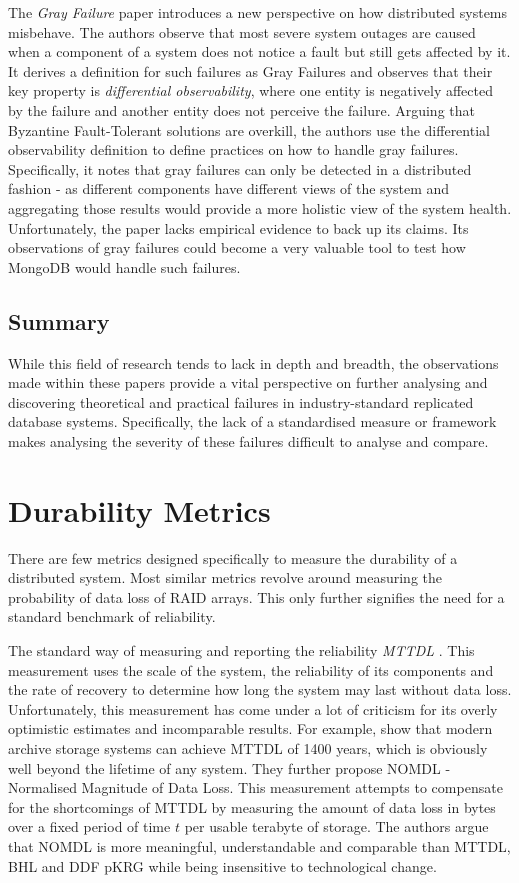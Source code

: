 The \textit{Gray Failure} \citep{gray-failure} paper introduces a new perspective on how distributed systems misbehave. The authors observe that most severe system outages are caused when a component of a system does not notice a fault but still gets affected by it. It derives a definition for such failures as Gray Failures and observes that their key property is \textit{differential observability}, where one entity is negatively affected by the failure and another entity does not perceive the failure. Arguing that Byzantine Fault-Tolerant solutions are overkill, the authors use the differential observability definition to define practices on how to handle gray failures. Specifically, it notes that gray failures can only be detected in a distributed fashion - as different components have different views of the system and aggregating those results would provide a more holistic view of the system health. Unfortunately, the paper lacks empirical evidence to back up its claims. Its observations of gray failures could become a very valuable tool to test how MongoDB would handle such failures.

\subsection{Summary}
While this field of research tends to lack in depth and breadth, the observations made within these papers provide a vital perspective on further analysing and discovering theoretical and practical failures in industry-standard replicated database systems. Specifically, the lack of a standardised measure or framework makes analysing the severity of these failures difficult to analyse and compare.

\section{Durability Metrics}
There are few metrics designed specifically to measure the durability of a distributed system. Most similar metrics revolve around measuring the probability of data loss of RAID arrays. This only further signifies the need for a standard benchmark of reliability.

The standard way of measuring and reporting the reliability \textit{MTTDL} \citep{mttdl}. This measurement uses the scale of the system, the reliability of its components and the rate of recovery to determine how long the system may last without data loss. Unfortunately, this measurement has come under a lot of criticism for its overly optimistic estimates and incomparable results. For example, \citep{mttdl-meaningless} show that modern archive storage systems can achieve MTTDL of 1400 years, which is obviously well beyond the lifetime of any system. They further propose NOMDL - Normalised Magnitude of Data Loss. This measurement attempts to compensate for the shortcomings of MTTDL by measuring the amount of data loss in bytes over a fixed period of time $t$ per usable terabyte of storage. The authors argue that NOMDL is more meaningful, understandable and comparable than MTTDL, BHL \citep{bit-preservation} and DDF pKRG \citep{enhanced-reliability-raid} while being insensitive to technological change.

